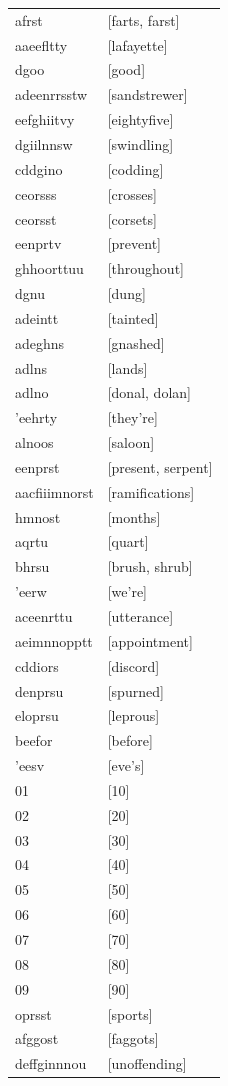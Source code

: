 \documentclass{article}
\begin{document}
\begin{tabular}{ll}
afrst & [farts, farst] \\
aaeefltty & [lafayette] \\
dgoo & [good] \\
adeenrrsstw & [sandstrewer] \\
eefghiitvy & [eightyfive] \\
dgiilnnsw & [swindling] \\
cddgino & [codding] \\
ceorsss & [crosses] \\
ceorsst & [corsets] \\
eenprtv & [prevent] \\
ghhoorttuu & [throughout] \\
dgnu & [dung] \\
adeintt & [tainted] \\
adeghns & [gnashed] \\
adlns & [lands] \\
adlno & [donal, dolan] \\
'eehrty & [they're] \\
alnoos & [saloon] \\
eenprst & [present, serpent] \\
aacfiiimnorst & [ramifications] \\
hmnost & [months] \\
aqrtu & [quart] \\
bhrsu & [brush, shrub] \\
'eerw & [we're] \\
aceenrttu & [utterance] \\
aeimnnopptt & [appointment] \\
cddiors & [discord] \\
denprsu & [spurned] \\
eloprsu & [leprous] \\
beefor & [before] \\
'eesv & [eve's] \\
01 & [10] \\
02 & [20] \\
03 & [30] \\
04 & [40] \\
05 & [50] \\
06 & [60] \\
07 & [70] \\
08 & [80] \\
09 & [90] \\
oprsst & [sports] \\
afggost & [faggots] \\
deffginnnou & [unoffending] \\

\end{tabular}
\end{document}
